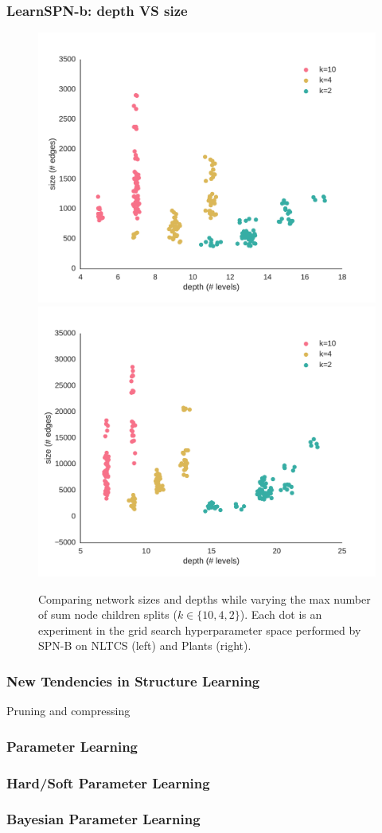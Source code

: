 \documentclass[xcolor={usenames,dvipsnames,svgnames}, compress]{beamer}
\begin{document}
\begin{frame}
  \frametitle{LearnSPN-b: depth VS size}

  \begin{figure}[htbp]
    \begin{center}
      \includegraphics[width=0.5\linewidth]{figures/nltcs-depth.pdf}
      \includegraphics[width=0.5\linewidth]{figures/plants-depth.pdf}
      \caption{Comparing network sizes and depths while varying the max
        number of sum node children splits ($k\in\{10, 4, 2\}$). Each dot is an experiment
        in the grid search hyperparameter space performed by
        \textsf{SPN-B} on NLTCS (left) and Plants (right).}
    \end{center}
  \end{figure}

\end{frame}

\begin{frame}
  \frametitle{New Tendencies in Structure Learning}
  Pruning and compressing
\end{frame}

\begin{frame}
\frametitle{Parameter Learning}
\end{frame}

\begin{frame}
  \frametitle{Hard/Soft Parameter Learning}
\end{frame}

\begin{frame}
  \frametitle{Bayesian Parameter Learning}
\end{frame}
\end{document}
